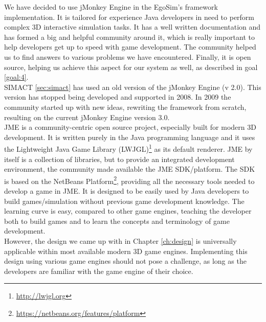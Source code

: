 We have decided to use jMonkey Engine in the EgoSim's framework implementation. It is tailored for experience Java developers in need to perform complex 3D interactive simulation tasks. It has a well written documentation and has formed a big and helpful community around it, which is really important to help developers get up to speed with game development. The community helped us to find answers to various problems we have encountered. Finally, it is open source, helping us achieve this aspect for our system as well, as described in goal \ref{goal:4}.\\

SIMACT \ref{sec:simact} has used an old version of the jMonkey Engine (v 2.0). This version has stopped being developed and supported in 2008. In 2009 the community started up with new ideas, rewriting the framework from scratch, resulting on the current jMonkey Engine version 3.0.\\

JME is a community-centric open source project, especially built for modern 3D development. It is written purely in the Java programming language and it uses the Lightweight Java Game Library (LWJGL)\footnote{\url{http://lwjgl.org}} as its default renderer. JME by itself is a collection of libraries, but to provide an integrated development environment, the community made available the JME SDK/platform. The SDK is based on the NetBeans Platform\footnote{\url{https://netbeans.org/features/platform}}, providing all the necessary tools needed to develop a game in JME. It is designed to be easily used by Java developers to build games/simulation without previous game development knowledge. The learning curve is easy, compared to other game engines, teaching the developer both to build games and to learn the concepts and terminology of game development.\\

However, the design we came up with in Chapter \ref{ch:design} is universally applicable within most available modern 3D game engines. Implementing this design using various game engines should not pose a challenge, as long as the developers are familiar with the game engine of their choice.\\

